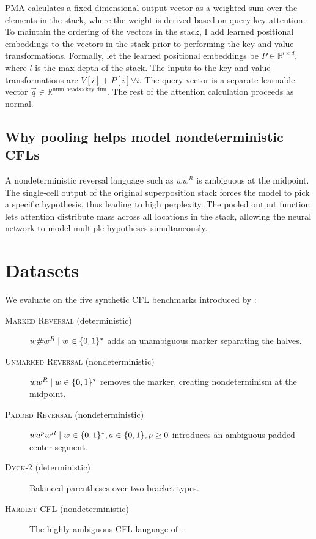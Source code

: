 PMA calculates a fixed-dimensional output vector as a weighted sum over the elements in the stack, where the weight is derived based on query-key attention. To maintain the ordering of the vectors in the stack, I add learned positional embeddings to the vectors in the stack prior to performing the key and value transformations. Formally, let the learned positional embeddings be $P \in \mathbb{R}^{l\times d}$, where $l$ is the max depth of the stack. The inputs to the key and value transformations are $V[i] + P[i]  \forall i$. The query vector is a separate learnable vector $\vec{q} \in \mathbb{R}^{\text{num\_heads}\times\text{key\_dim}}$. The rest of the attention calculation proceeds as normal.

\subsection{Why pooling helps model nondeterministic CFLs}
A nondeterministic reversal language such as $ww^R$ is ambiguous at the midpoint. The single‑cell output of the original superposition stack forces the model to pick a specific hypothesis, thus leading to high perplexity. The pooled output function lets attention distribute mass across all locations in the stack, allowing the neural network to model multiple hypotheses simultaneously.


\section{Datasets}
We evaluate on the five synthetic CFL benchmarks introduced by \citet{dusell2024stack}:
\begin{description}
  \item[\textsc{Marked Reversal} (deterministic)] $\\{w\#w^R \mid w \in \{0,1\}^*\\}$ adds an unambiguous marker separating the halves.
  \item[\textsc{Unmarked Reversal} (nondeterministic)] $\\{ww^R \mid w \in \{0,1\}^*\\}$ removes the marker, creating nondeterminism at the midpoint.
  \item[\textsc{Padded Reversal} (nondeterministic)] $\\{w a^p w^R \mid w \in \{0,1\}^*, a \in \{0,1\}, p \ge 0\\}$ introduces an ambiguous padded center segment.
  \item[\textsc{Dyck‑2} (deterministic)] Balanced parentheses over two bracket types.
  \item[\textsc{Hardest CFL} (nondeterministic)] The highly ambiguous CFL language of \citet{doi:10.1137/0202025}.
\end{description}

